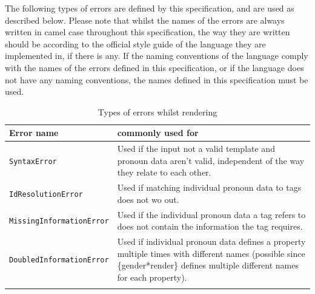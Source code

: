 \documentclass{article}
\begin{document}
    The following types of errors are defined by this specification, and are used as described below.
    Please note that whilst the names of the errors are always written in camel case throughout this specification, the way they are written should be according to the official style guide of the language they are implemented in, if there is any.
    If the naming conventions of the language comply with the names of the errors defined in this specification, or if the language does not have any naming conventions, the names defined in this specification must be used.

    \begin{flushleft}
        \begin{center}
            \begin{longtable}{|>{\raggedright\arraybackslash}p{13em} | >{\raggedright\arraybackslash}p{19em} |}
                 \hline
                 Error name & commonly used for \\
                 \hline\hline
                 \texttt{SyntaxError} & Used if the input not a valid template and pronoun data aren't valid, independent of the way they relate to each other. \\
                 \hline
                 \texttt{IdResolutionError} & Used if matching individual pronoun data to tags does not wo out.\\
                 \hline
                 \texttt{MissingInformationError} & Used if the individual pronoun data a tag refers to does not contain the information the tag requires.\\
                 \hline
                 \texttt{DoubledInformationError} & Used if individual pronoun data defines a property multiple times with different names (possible since \{gender*render\} defines multiple different names for each property). \\
                 \hline
                \caption{Types of errors whilst rendering}
            \end{longtable}
        \end{center}
    \end{flushleft}
\end{document}
